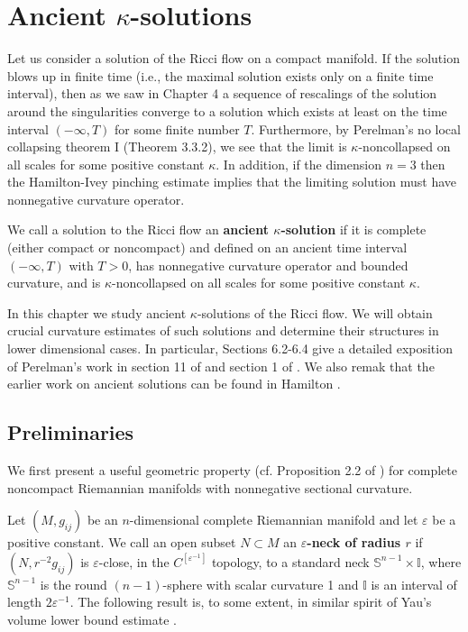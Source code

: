 
\chapter{Ancient \texorpdfstring{$\kappa$}{kappa}-solutions}
\label{chap:cz-ancient-kappa-solutions}

\bigskip
Let us consider a solution of the Ricci flow on a compact
manifold. If the solution blows up in finite time (i.e., the
maximal solution exists only on a finite time interval), then as
we saw in Chapter 4 a sequence of rescalings of the solution
around the singularities converge to a solution which exists at
least on the time interval $(-\infty,T)$ for some finite number
$T$. Furthermore, by Perelman's no local collapsing theorem I
(Theorem 3.3.2), we see that the limit is $\kappa$-noncollapsed on
all scales for some positive constant $\kappa$. In addition, if
the dimension $n=3$ then the Hamilton-Ivey pinching estimate
implies that the limiting solution must have nonnegative curvature
operator.

We call a solution to the Ricci flow an \textbf{ancient
$\kappa$-solution} if it is
complete (either compact or noncompact) and defined on an ancient
time interval $(-\infty,T)$ with $T>0$, has nonnegative curvature
operator and bounded curvature, and is $\kappa$-noncollapsed on
all scales for some positive constant $\kappa$.

In this chapter we study ancient $\kappa$-solutions of the Ricci
flow. We will obtain crucial curvature estimates of such solutions
and determine their structures in lower dimensional cases. In
particular, Sections 6.2-6.4 give a detailed exposition of
Perelman's work in section 11 of \cite{P1} and section 1 of
\cite{P2}. We also remak that the earlier work on ancient
solutions can be found in Hamilton \cite{Ha95F}.


\section{Preliminaries}

We first present a useful geometric property (cf. Proposition 2.2 of
\cite{CZ05F}) for complete noncompact Riemannian manifolds with
nonnegative sectional curvature.

Let $(M,g_{ij})$ be an $n$-dimensional complete Riemannian
manifold and let $\varepsilon$ be a positive constant. We call an
open subset $N\subset M$ an \textbf{$\varepsilon$-neck of radius
$r$} if $(N,
r^{-2}g_{ij})$ is $\varepsilon$-close, in the
$C^{[\varepsilon^{-1}]}$ topology, to a standard neck
$\mathbb{S}^{n-1}\times \mathbb{I}$, where $\mathbb{S}^{n-1}$ is
the round $(n-1)$-sphere with scalar curvature 1 and $\mathbb{I}$
is an interval of length $2\varepsilon^{-1}$. The following result
is, to some extent, in similar spirit of Yau's volume lower bound
estimate \cite{Y76}.

